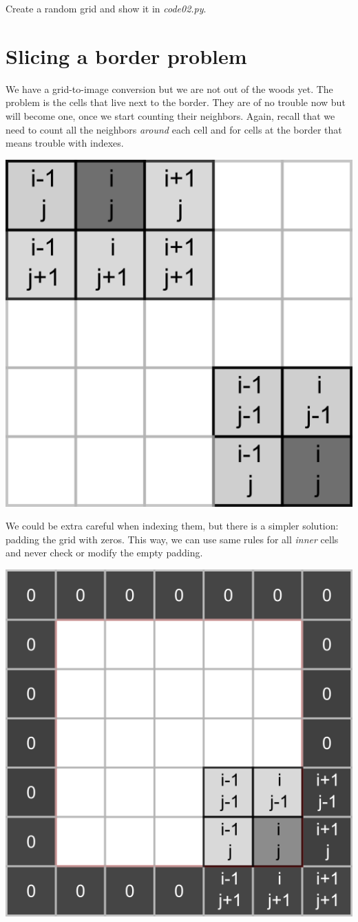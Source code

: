 \documentclass[
]{book}
\begin{document}
Create a random grid and show it in \emph{code02.py}.

\hypertarget{slicing-a-border-problem}{%
\section{Slicing a border problem}\label{slicing-a-border-problem}}

We have a grid-to-image conversion but we are not out of the woods yet. The problem is the cells that live next to the border. They are of no trouble now but will become one, once we start counting their neighbors. Again, recall that we need to count all the neighbors \emph{around} each cell and for cells at the border that means trouble with indexes.

\begin{center}\includegraphics[width=0.36\linewidth]{images/game-of-life-border} \end{center}

We could be extra careful when indexing them, but there is a simpler solution: padding the grid with zeros. This way, we can use same rules for all \emph{inner} cells and never check or modify the empty padding.

\begin{center}\includegraphics[width=0.5\linewidth]{images/game-of-life-padding} \end{center}
\end{document}
